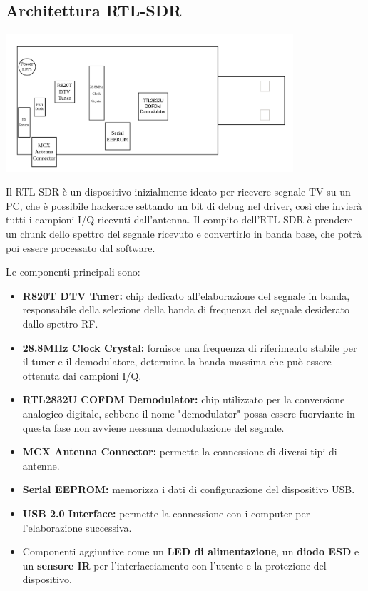 \subsection*{Architettura RTL-SDR}
\begin{center}
    \includegraphics[width=0.8\textwidth]{imgs/sdr.png}
\end{center}


Il RTL-SDR è un dispositivo inizialmente ideato per ricevere segnale TV su un PC, che è possibile hackerare settando un bit di debug nel driver, così che invierà tutti i campioni I/Q ricevuti dall'antenna.
Il compito dell'RTL-SDR è prendere un chunk dello spettro del segnale ricevuto e convertirlo in banda base, che potrà poi essere processato dal software.

Le componenti principali sono:
\begin{itemize}
    \item \textbf{R820T DTV Tuner:} chip dedicato all'elaborazione del segnale in banda, responsabile della selezione della banda di frequenza del segnale desiderato dallo spettro RF.
    \item \textbf{28.8MHz Clock Crystal:} fornisce una frequenza di riferimento stabile per il tuner e il demodulatore, determina la banda massima che può essere ottenuta dai campioni I/Q.
    \item \textbf{RTL2832U COFDM Demodulator:} chip utilizzato per la conversione analogico-digitale, sebbene il nome "demodulator" possa essere fuorviante in questa fase non avviene nessuna demodulazione del segnale.
    \item \textbf{MCX Antenna Connector:} permette la connessione di diversi tipi di antenne.
    \item \textbf{Serial EEPROM:} memorizza i dati di configurazione del dispositivo USB.
    \item \textbf{USB 2.0 Interface:} permette la connessione con i computer per l'elaborazione successiva.
    \item Componenti aggiuntive come un \textbf{LED di alimentazione}, un \textbf{diodo ESD} e un \textbf{sensore IR} per l'interfacciamento con l'utente e la protezione del dispositivo.
\end{itemize}

